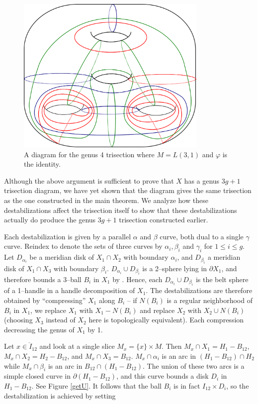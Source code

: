 \documentclass[12pt]{amsart}
\newcommand{\del}{\partial }
\theoremstyle{definition}
\theoremstyle{remark}
\begin{document}
\begin{figure}[h]
\centering
\includegraphics[height=3in]{LxS12destab.png}
\caption{A diagram for the genus 4 trisection where $M = L(3,1)$ and $\varphi$ is the identity. }
\label{ls12destab}
\end{figure}

Although the above argument is sufficient to prove that $X$ has a genus $3g+1$ trisection diagram, we have yet shown that the diagram gives the same trisection as the one constructed in the main theorem.  We analyze how these destabilizations affect the trisection itself to show that these destabilizations actually do produce the genus $3g+1$ trisection constructed earlier.  

Each destabilization is given by a parallel $\alpha$ and $\beta$ curve, both dual to a single $\gamma$ curve.  Reindex to denote the sets of three curves by $\alpha_i,\beta_i$ and $\gamma_i$ for $1 \le i \le g$.  Let $D_{\alpha_i}$ be a meridian disk of $X_1 \cap X_2$ with boundary $\alpha_i$, and $D_{\beta_i}$ a meridian disk of $X_1 \cap X_3$ with boundary $\beta_i$.  $D_{\alpha_i} \cup D_{\beta_i}$ is a 2--sphere lying in $\del X_1$, and therefore bounds a 3--ball $B_i$ in $X_1$ by \cite{LaudenbachPoenaru1}.  Hence, each $D_{\alpha_i} \cup D_{\beta_i}$ is the belt sphere of a 1--handle in a handle decomposition of $X_1$.  The destabilizations are therefore obtained by ``compressing'' $X_1$ along $B_i$ -- if $N(B_i)$ is a regular neighborhood of $B_i$ in $X_1$, we replace $X_1$ with $X_1 - N(B_i)$ and replace $X_2$ with $X_2 \cup N(B_i)$ (choosing $X_3$ instead of $X_2$ here is topologically equivalent).  Each compression decreasing the genus of $X_1$ by 1.

Let $x \in \mathring I_{12}$ and look at a single slice $M_x = \{x\} \times M$.  Then $M_x \cap X_1 = H_1 - B_{12}$, $M_x \cap X_2 = H_2 - B_{12}$, and $M_x \cap X_3 = B_{12}$.  $M_x \cap \alpha_i$ is an arc in $(H_1 - B_{12}) \cap H_2$ while $M_x \cap \beta_i$ is an arc in $B_{12} \cap (H_1 - B_{12})$.  The union of these two arcs is a simple closed curve in $\del (H_1 - B_{12})$, and this curve bounds a disk $D_i$ in $H_1 - B_{12}$.  See Figure \ref{getU}.  It follows that the ball $B_i$ is in fact $I_{12} \times D_i$, so the destabilization is achieved by setting 
\end{document}

